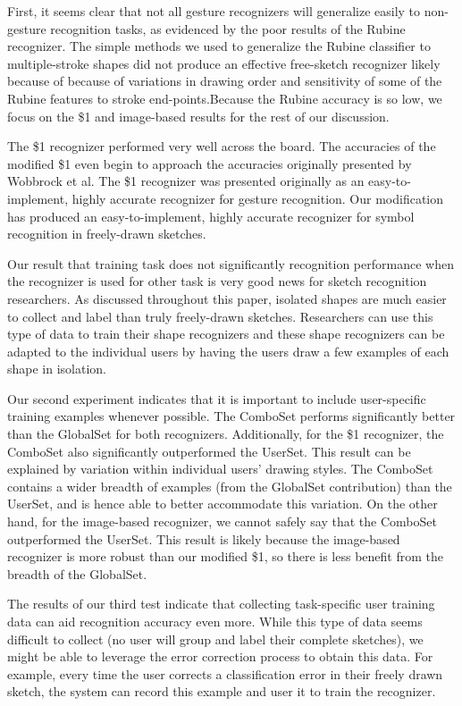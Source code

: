 \documentclass{egpubl}
\begin{document}
First, it seems clear that not all gesture recognizers will generalize easily to non-gesture recognition tasks, as evidenced by the poor results of the Rubine recognizer.   The simple methods we used to generalize the Rubine classifier to multiple-stroke shapes did not produce an effective free-sketch recognizer likely because of because of variations in drawing order and sensitivity of some of the Rubine features to stroke end-points.Because the Rubine accuracy is so low, we focus on the \$1 and image-based results for the rest of our discussion.

The \$1 recognizer performed very well across the board. The accuracies of the modified \$1 even begin to approach the accuracies originally presented by Wobbrock et al\cite{dollar}.  The \$1 recognizer was presented originally as an easy-to-implement, highly accurate recognizer for gesture recognition.  Our modification has produced an easy-to-implement, highly accurate recognizer for symbol recognition in freely-drawn sketches.

Our result that training task does not significantly recognition performance when the recognizer is used for other task is very good news for sketch recognition researchers.  As discussed throughout this paper, isolated shapes are much easier to collect and label than truly freely-drawn sketches.  Researchers can use this type of data to train their shape recognizers and these shape recognizers can be adapted to the individual users by having the users draw a few examples of each shape in isolation.

Our second experiment indicates that it is important to include user-specific training examples whenever possible.  The ComboSet performs significantly better than the GlobalSet for both recognizers.  Additionally, for the \$1 recognizer, the ComboSet also significantly outperformed the UserSet. This result can be explained by variation within individual users' drawing styles. The ComboSet contains a wider breadth of examples (from the GlobalSet contribution) than the UserSet, and is hence able to better accommodate this variation. On the other hand, for the image-based recognizer, we cannot safely say that the ComboSet outperformed the UserSet. This result is likely because the image-based recognizer is more robust than our modified \$1, so there is less benefit from the breadth of the GlobalSet. 

The results of our third test indicate that collecting task-specific user training data can aid recognition accuracy even more.  While this type of data seems difficult to collect (no user will group and label their complete sketches), we might be able to leverage the error correction process to obtain this data.  For example, every time the user corrects a classification error in their freely drawn sketch, the system can record this example and user it to train the recognizer.  
\end{document}
